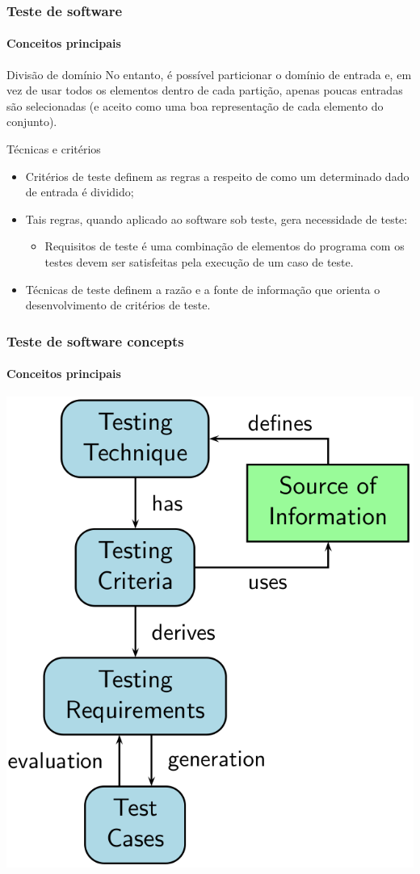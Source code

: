\begin{frame}
\frametitle{Teste de software}
\framesubtitle{Conceitos principais}

\begin{block:principle}{Divisão de domínio}
No entanto, é possível particionar o domínio de entrada e, em vez de usar todos os elementos dentro de cada partição, apenas poucas entradas são selecionadas (e aceito como uma boa representação de cada elemento do conjunto).
\end{block:principle}

\begin{block:fact}{Técnicas e critérios}
\begin{itemize}
	\item Critérios de teste definem as regras a respeito de como um determinado dado de entrada é dividido;

	\item Tais regras, quando aplicado ao software sob teste, gera necessidade de teste:
	\begin{itemize}
		\item Requisitos de teste é uma combinação de elementos do programa com os testes devem ser satisfeitas pela execução de um caso de teste.
	\end{itemize}

	\item Técnicas de teste definem a razão e a fonte de informação que orienta o desenvolvimento de critérios de teste.
\end{itemize}
\end{block:fact}
\end{frame}




\begin{frame}[c, hasprev=true, hasnext=false]
\frametitle{Teste de software concepts}
\framesubtitle{Conceitos principais}

\begin{block:fact}{}
	\centering
	\includegraphics[scale=.3]{teste-de-software/conceitos-basicos/Imagens/software-testing}
\end{block:fact}
\end{frame}